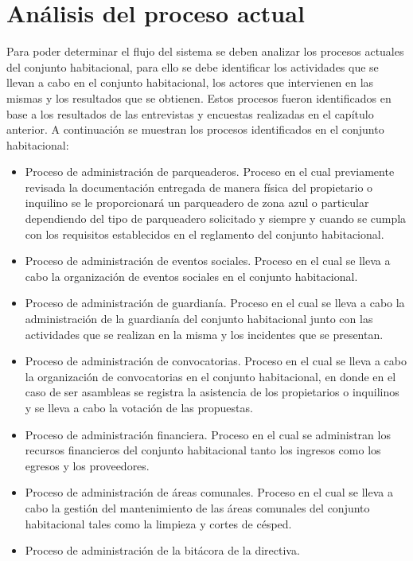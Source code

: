 \section{Análisis del proceso actual}\label{sec:analisis-proceso-actual}

Para poder determinar el flujo del sistema se deben analizar los procesos actuales del conjunto habitacional, para ello se debe identificar los actividades que se llevan a cabo en el conjunto habitacional, los actores que intervienen en las mismas y los resultados que se obtienen.
Estos procesos fueron identificados en base a los resultados de las entrevistas y encuestas realizadas en el capítulo anterior.
\bigbreak
A continuación se muestran los procesos identificados en el conjunto habitacional:
\begin{itemize}
    \item Proceso de administración de parqueaderos.
    Proceso en el cual previamente revisada la documentación entregada de manera física del propietario o inquilino se le proporcionará un parqueadero de zona azul o particular dependiendo del tipo de parqueadero solicitado y siempre y cuando se cumpla con los requisitos establecidos en el reglamento del conjunto habitacional.
    \item Proceso de administración de eventos sociales.
    Proceso en el cual se lleva a cabo la organización de eventos sociales en el conjunto habitacional.
    \item Proceso de administración de guardianía.
    Proceso en el cual se lleva a cabo la administración de la guardianía del conjunto habitacional junto con las actividades que se realizan en la misma y los incidentes que se presentan.
    \item Proceso de administración de convocatorias.
    Proceso en el cual se lleva a cabo la organización de convocatorias en el conjunto habitacional, en donde en el caso de ser asambleas se registra la asistencia de los propietarios o inquilinos y se lleva a cabo la votación de las propuestas.
    \item Proceso de administración financiera.
    Proceso en el cual se administran los recursos financieros del conjunto habitacional tanto los ingresos como los egresos y los proveedores.
    \item Proceso de administración de áreas comunales.
    Proceso en el cual se lleva a cabo la gestión del mantenimiento de las áreas comunales del conjunto habitacional tales como la limpieza y cortes de césped.
    \item Proceso de administración de la bitácora de la directiva.

\end{itemize}
